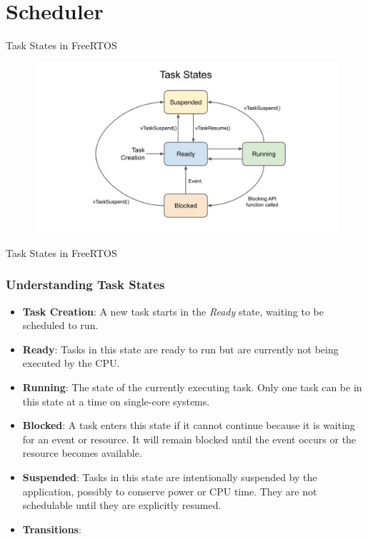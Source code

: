 \documentclass[10pt]{beamer}
\begin{document}
\section{Scheduler}

\begin{frame}{Task States in FreeRTOS}

  \begin{figure}[h]
    \centering
    \includegraphics[width=1.0\textwidth]{figures/FreeRTOScheduling.jpeg}
    \label{fig:FreeRTOScheduling}
  \end{figure}
\end{frame}


\begin{frame}{Task States in FreeRTOS}
  \frametitle{Understanding Task States}
  \begin{itemize}
    \item \textbf{Task Creation}: A new task starts in the \textit{Ready} state, waiting to be scheduled to run.
    \item \textbf{Ready}: Tasks in this state are ready to run but are currently not being executed by the CPU.
    \item \textbf{Running}: The state of the currently executing task. Only one task can be in this state at a time on single-core systems.
    \item \textbf{Blocked}: A task enters this state if it cannot continue because it is waiting for an event or resource. It will remain blocked until the event occurs or the resource becomes available.
    \item \textbf{Suspended}: Tasks in this state are intentionally suspended by the application, possibly to conserve power or CPU time. They are not schedulable until they are explicitly resumed.
    \item \textbf{Transitions}:
  \end{itemize}
 
\end{frame}
\end{document}
